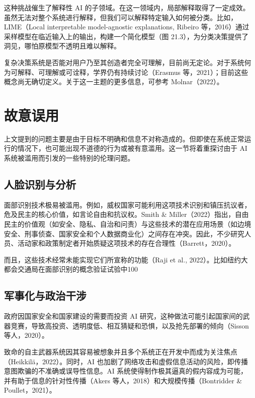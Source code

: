 这种挑战催生了解释性 AI 的子领域。在这一领域内，局部解释取得了一定成效。虽然无法对整个系统进行解释，但我们可以解释特定输入如何被分类。比如，LIME（Local interpretable model-agnostic explanations, Ribeiro 等，2016）通过采样模型在临近输入上的输出，构建一个简化模型（图 21.3），为分类决策提供了洞见，哪怕原模型不透明且难以解释。

复杂决策系统是否能对用户乃至其创造者完全可理解，目前尚无定论。对于系统何为可解释、可理解或可诠释，学界仍有持续讨论（Erasmus 等，2021）；目前这些概念尚无确切定义。关于这一主题的更多信息，可参考 Molnar（2022）。

\section{故意误用}
上文提到的问题主要是由于目标不明确和信息不对称造成的。但即使在系统正常运行的情况下，也可能出现不道德的行为或被有意滥用。这一节将着重探讨由于 AI 系统被滥用而引发的一些特别的伦理问题。

\subsection{人脸识别与分析}
面部识别技术极易被滥用。例如，威权国家可能利用这项技术识别和镇压抗议者，危及民主的核心价值，如言论自由和抗议权。Smith \& Miller（2022）指出，自由民主的价值观（如安全、隐私、自治和问责）与这些技术的潜在应用场景（如边境安全、刑事侦查、国家安全和个人数据商业化）之间存在冲突。因此，不少研究人员、活动家和政策制定者开始质疑这项技术的存在合理性（Barrett，2020）。

而且，这些技术经常未能实现它们所宣称的功能（Raji et al., 2022）。比如纽约大都会交通局在面部识别的概念验证试验中100%

\subsection{军事化与政治干涉}
政府因国家安全和国家建设的需要而投资 AI 研究，这种做法可能引起国家间的武器竞赛，导致高投资、透明度低、相互猜疑和恐惧，以及抢先部署的倾向（Sisson 等人，2020）。

致命的自主武器系统因其容易被想象并且多个系统正在开发中而成为关注焦点（Heikkilä，2022）。同时，AI 也加剧了网络攻击和虚假信息活动的风险，即传播意图欺骗的不准确或误导性信息。AI 系统使得制作极其逼真的假内容成为可能，并有助于信息的针对性传播（Akers 等人，2018）和大规模传播（Bontridder \& Poullet，2021）。


